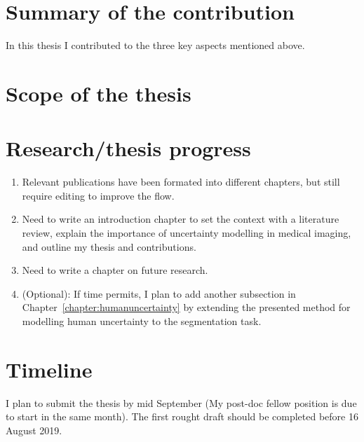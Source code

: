 \section*{Summary of the contribution} 
In this thesis I contributed to the three key aspects mentioned above. 


\section*{Scope of the thesis}


\section*{Research/thesis progress}
\begin{enumerate}
	\item Relevant publications have been formated into different chapters, but still require editing to improve the flow. 
	\item Need to write an introduction chapter to set the context with a literature review, explain the importance of uncertainty modelling in medical imaging, and outline my thesis and contributions. 
	\item Need to write a chapter on future research. 
	\item (Optional): If time permits, I plan to add another subsection in Chapter~\ref{chapter:humanuncertainty} by extending the presented method for modelling human uncertainty to the segmentation task.		
\end{enumerate}

\section*{Timeline}
I plan to submit the thesis by mid September (My post-doc fellow position is due to start in the same month). The first rought draft should be completed before 16 August 2019. 

\clearpage
